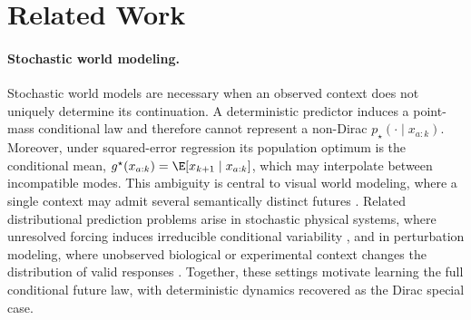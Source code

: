 \section{Related Work}

\paragraph{Stochastic world modeling.}
Stochastic world models are necessary when an observed context does not
uniquely determine its continuation.  A deterministic predictor induces a
point-mass conditional law and therefore cannot represent a non-Dirac
$p_\star(\cdot\mid x_{a:k})$.  Moreover, under squared-error regression its
population optimum is the conditional mean,
$g^\star(x_{a:k})=\E[x_{k+1}\mid x_{a:k}]$, which may interpolate between
incompatible modes.  This ambiguity is central to visual world modeling, where
a single context may admit several semantically distinct futures
\citep{porcher2026flow}.  Related distributional prediction problems arise in
stochastic physical systems, where unresolved forcing induces irreducible
conditional variability \citep{pfister2026stocbench}, and in perturbation
modeling, where unobserved biological or experimental context changes the
distribution of valid responses \citep{yuan2026perturbdiff}.  Together, these
settings motivate learning the full conditional future law, with deterministic
dynamics recovered as the Dirac special case.
